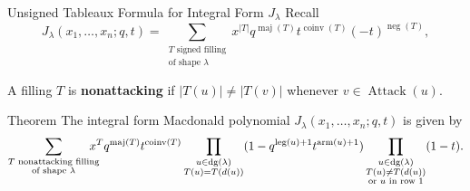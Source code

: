 \documentclass[aspectratio = 1609]{beamer}
\theoremstyle{definition}
\theoremstyle{plain} %
\DeclareMathOperator{\maj}{maj}
\DeclareMathOperator{\coinv}{coinv}
\DeclareMathOperator{\dg}{dg}
\DeclareMathOperator{\leg}{leg}
\DeclareMathOperator{\arm}{arm}
\DeclareMathOperator{\Attack}{Attack}
\newcommand{\south}[1]{d({#1})}
\begin{document}
\begin{frame}{Unsigned Tableaux Formula for Integral Form \(J_\lambda\)}
  Recall
  \[
    J_{\lambda}(x_1, \dots, x_n; q, t)
    = \sum_{\substack{T \text{ signed filling} \\ \text{of shape } \lambda}}
    x^{|T|}
    q^{\maj(T)}
    t^{\coinv(T)}
    (-t)^{\operatorname{neg}(T)},
  \]

  \vspace{1em}

  A filling \(T\) is \textbf{nonattacking} if \(\left|T(u)\right| \neq \left|T(v)\right|\) whenever \(v \in \Attack(u)\).

  \vspace{1em}

  \begin{block}{Theorem \parencite{HHL05}}
    The integral form Macdonald polynomial \(J_{\lambda}(x_1, \dots, x_n; q, t)\) is given by
    \[
      \sum_{\substack{T \text{ nonattacking filling} \\ \text{of shape } \lambda}}
      \mkern-18mu
      x^{T}
      q^{\maj(T)}
      t^{\coinv(T)}
      \prod_{\substack{u \in \dg(\lambda) \\ T(u) = T(\south{u})}}
      (1 - q^{\leg(u) + 1} t^{\arm(u) + 1})
      \prod_{\substack{u \in \dg(\lambda) \\ T(u) \neq T(\south{u}) \\ \text{or } u \text{ in row } 1}}
      (1 - t).
    \]
  \end{block}
\end{frame}
\end{document}
